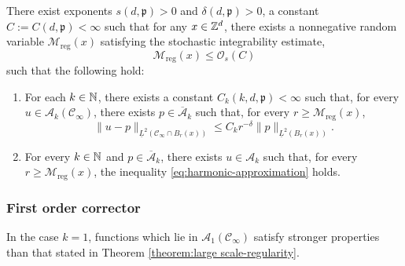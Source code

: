 \documentclass[12pt]{amsart}
\numberwithin{equation}{section}
\begin{document}
	
	\begin{theorem} \label{theorem:large scale-regularity}
		There exist exponents $s(d, \mathfrak{p}) > 0$ and $\delta(d, \mathfrak{p}) > 0$, a constant $C := C(d , \mathfrak{p}) < \infty$ such that for any $x \in \mathbb{Z}^d$, there exists a nonnegative random variable  $\mathcal{M}_{\mathrm{reg}}(x)$  satisfying the stochastic integrability estimate, 
		\begin{equation}
			\mathcal{M}_{\mathrm{reg}}(x) \leq \mathcal{O}_s(C)
		\end{equation}
		such that the following hold:
		\begin{enumerate}[label=(\roman*)]
			\item For each $k \in \operatorname{\mathbb{N}}$, there exists a constant $C_k(k, d, \mathfrak{p}) < \infty$ such that, for every $u \in \mathcal{A}_k(\mathscr{C}_{\infty})$, 
			there exists $p \in \overline{\mathcal{A}}_k$ such that, for every $r \geq   \mathcal{M}_{\mathrm{reg}} (x)$, 
			\begin{equation} \label{eq:harmonic-approximation}
				\| u - p\|_{\underline{L}^2(\mathscr{C}_{\infty} \cap B_r(x))} \leq C_k r^{-\delta} \|p\|_{\underline{L}^2(B_r(x))}.
			\end{equation}
			\item For every $k \in \operatorname{\mathbb{N}}$ and $p \in \overline{\mathcal{A}}_k$, there exists $u \in \mathcal{A}_k$ such that, for every $r \geq   \mathcal{M}_{\mathrm{reg}}(x)$, 
			the inequality \eqref{eq:harmonic-approximation} holds. 
		\end{enumerate}
	\end{theorem}
	
	
	\subsubsection{First order corrector}
	In the case $k = 1$,  functions which lie in $\mathcal{A}_1(\mathscr{C}_{\infty})$ satisfy stronger properties than that stated in Theorem \ref{theorem:large scale-regularity}. 
	
\end{document}
